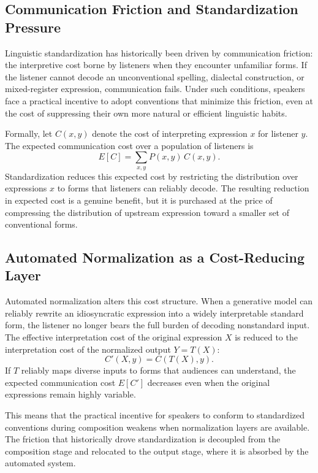 \documentclass[12pt,a4paper]{article}
\theoremstyle{definition}
\theoremstyle{plain}
\theoremstyle{remark}
\begin{document}
\subsection{Communication Friction and Standardization Pressure}

Linguistic standardization has historically been driven by communication friction: the
interpretive cost borne by listeners when they encounter unfamiliar forms. If the listener
cannot decode an unconventional spelling, dialectal construction, or mixed-register
expression, communication fails. Under such conditions, speakers face a practical incentive
to adopt conventions that minimize this friction, even at the cost of suppressing their
own more natural or efficient linguistic habits.

Formally, let $C(x, y)$ denote the cost of interpreting expression $x$ for listener $y$.
The expected communication cost over a population of listeners is
\[
E[C] = \sum_{x, y} P(x, y) \, C(x, y).
\]
Standardization reduces this expected cost by restricting the distribution over expressions
$x$ to forms that listeners can reliably decode. The resulting reduction in expected cost is
a genuine benefit, but it is purchased at the price of compressing the distribution of
upstream expression toward a smaller set of conventional forms.

\subsection{Automated Normalization as a Cost-Reducing Layer}

Automated normalization alters this cost structure. When a generative model can reliably
rewrite an idiosyncratic expression into a widely interpretable standard form, the listener
no longer bears the full burden of decoding nonstandard input. The effective interpretation
cost of the original expression $X$ is reduced to the interpretation cost of the normalized
output $Y = T(X)$:
\[
C'(X, y) = C(T(X), y).
\]
If $T$ reliably maps diverse inputs to forms that audiences can understand, the expected
communication cost $E[C']$ decreases even when the original expressions remain highly
variable.

This means that the practical incentive for speakers to conform to standardized conventions
during composition weakens when normalization layers are available. The friction that
historically drove standardization is decoupled from the composition stage and relocated to
the output stage, where it is absorbed by the automated system.
\end{document}
